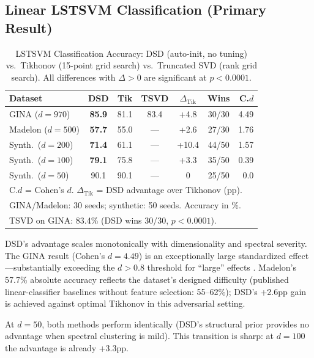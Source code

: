\documentclass[preprint,review,12pt]{elsarticle}
\begin{document}
\subsection{Linear LSTSVM Classification (Primary Result)}

\begin{table}[!t]
\centering
\caption{LSTSVM Classification Accuracy: DSD (auto-init, no tuning) vs.\ Tikhonov (15-point grid search) vs.\ Truncated SVD (rank grid search). All differences with $\Delta > 0$ are significant at $p < 0.0001$.}
\label{tab:lstsvm_results}
\small
\begin{tabular}{@{}lcccccr@{}}
\toprule
\textbf{Dataset} & \textbf{DSD} & \textbf{Tik} & \textbf{TSVD} & \textbf{$\Delta_{\text{Tik}}$} & \textbf{Wins} & \textbf{C.$d$} \\
\midrule
GINA ($d{=}970$) & \textbf{85.9} & 81.1 & 83.4 & +4.8 & 30/30 & 4.49 \\
Madelon ($d{=}500$) & \textbf{57.7} & 55.0 & --- & +2.6 & 27/30 & 1.76 \\
Synth.\ ($d{=}200$) & \textbf{71.4} & 61.1 & --- & +10.4 & 44/50 & 1.57 \\
Synth.\ ($d{=}100$) & \textbf{79.1} & 75.8 & --- & +3.3 & 35/50 & 0.39 \\
Synth.\ ($d{=}50$) & 90.1 & 90.1 & --- & 0 & 25/50 & 0.0 \\
\bottomrule
\multicolumn{7}{l}{\scriptsize C.$d$ = Cohen's $d$. $\Delta_{\text{Tik}}$ = DSD advantage over Tikhonov (pp).}\\
\multicolumn{7}{l}{\scriptsize GINA/Madelon: 30 seeds; synthetic: 50 seeds. Accuracy in \%.}\\
\multicolumn{7}{l}{\scriptsize TSVD on GINA: 83.4\% (DSD wins 30/30, $p < 0.0001$).}
\end{tabular}
\end{table}

DSD's advantage scales monotonically with dimensionality and spectral severity. The GINA result (Cohen's $d = 4.49$) is an exceptionally large standardized effect---substantially exceeding the $d > 0.8$ threshold for ``large'' effects \cite{cohen1988statistical}. Madelon's 57.7\% absolute accuracy reflects the dataset's designed difficulty (published linear-classifier baselines without feature selection: 55--62\%); DSD's +2.6pp gain is achieved against optimal Tikhonov in this adversarial setting.

At $d{=}50$, both methods perform identically (DSD's structural prior provides no advantage when spectral clustering is mild). This transition is sharp: at $d{=}100$ the advantage is already +3.3pp.
\end{document}
